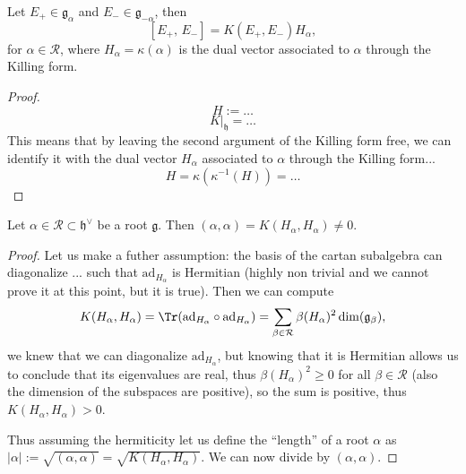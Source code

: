 \begin{lemma}
    Let \(E_+ \in \mathfrak{g}_{\alpha}\) and \(E_- \in \mathfrak{g}_{-\alpha}\), then
    \[
        [E_+ ,\, E_-] = K(E_+,E_-) H_{\alpha},
    \]
    for \(\alpha \in \mathcal{R}\), where \(H_{\alpha} = \kappa(\alpha)\) is the dual vector associated to \(\alpha\) through the Killing form.
\end{lemma}
\begin{proof}
    \[
        H:=\dots
    \]
    \[
        K\big|_{\mathfrak{h}} = \dots
    \]
    This means that by leaving the second argument of the Killing form free, we can identify it with the dual vector \(H_{\alpha}\) associated to \(\alpha\) through the Killing form...
    \[
        H = \kappa(\kappa^{-1}(H)) =\dots
    \]
\end{proof}

\begin{lemma}
    Let \(\alpha \in \mathcal{R} \subset \mathfrak{h}^\vee\) be a root \(\mathfrak{g}\). Then \((\alpha, \alpha) = K(H_{\alpha}, H_{\alpha}) \neq 0\).
\end{lemma}
\begin{proof}
    Let us make a futher assumption: the basis of the cartan subalgebra can diagonalize ... such that \(\mathrm{ad}_{H_{\alpha}}\) is Hermitian (highly non trivial and we cannot prove it at this point, but it is true). Then we can compute
    \[
        K(H_{\alpha}, H_{\alpha}) = \Tr(\mathrm{ad}_{H_{\alpha}} \circ \mathrm{ad}_{H_{\alpha}}) = \sum_{\beta \in \mathcal{R}}  \beta(H_{\alpha})^2 \dim(\mathfrak{g}_\beta),
    \]
    we knew that we can diagonalize \(\mathrm{ad}_{H_{\alpha}}\), but knowing that it is Hermitian allows us to conclude that its eigenvalues are real, thus \(\beta(H_{\alpha})^2 \geq 0\) for all \(\beta \in \mathcal{R}\) (also the dimension of the subspaces are positive), so the sum is positive, thus \(K(H_{\alpha}, H_{\alpha}) > 0\).

    Thus assuming the hermiticity let us define the ``length'' of a root \(\alpha\) as \(|\alpha| := \sqrt{(\alpha, \alpha)} = \sqrt{K(H_{\alpha}, H_{\alpha})}\). We can now divide by \((\alpha, \alpha)\).
\end{proof}

